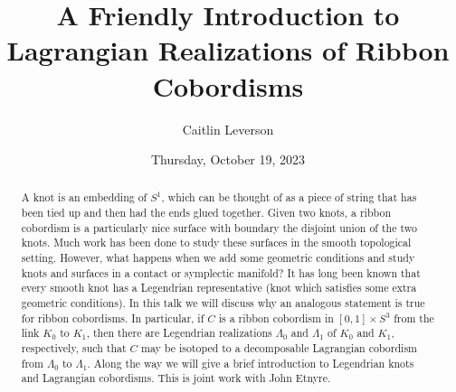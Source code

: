 \documentclass{UAmathtalk}
\author{Caitlin Leverson}
\title{A Friendly Introduction to Lagrangian Realizations of Ribbon Cobordisms}
\date{Thursday, October 19, 2023}
\begin{document}
\maketitle

\begin{abstract}
A knot is an embedding of $S^1$, which can be thought of as a piece of string that has been tied up and then had the ends glued together. Given two knots, a ribbon cobordism is a particularly nice surface with boundary the disjoint union of the two knots. Much work has been done to study these surfaces in the smooth topological setting. However, what happens when we add some geometric conditions and study knots and surfaces in a contact or symplectic manifold? It has long been known that every smooth knot has a Legendrian representative (knot which satisfies some extra geometric conditions). In this talk we will discuss why an analogous statement is true for ribbon cobordisms. In particular, if $C$ is a ribbon cobordism in $[0,1]\times S^3$ from the link $K_0$ to $K_1$, then there are Legendrian realizations $\Lambda_0$ and $\Lambda_1$ of $K_0$ and $K_1$, respectively, such that $C$ may be isotoped to a decomposable Lagrangian cobordism from $\Lambda_0$ to $\Lambda_1$. Along the way we will give a brief introduction to Legendrian knots and Lagrangian cobordisms. This is joint work with John Etnyre.
\end{abstract}
\end{document}
